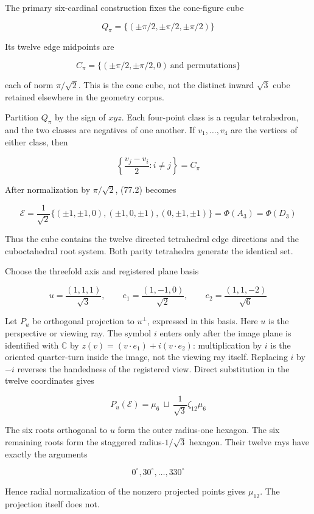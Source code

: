 \documentclass[
  11pt,
]{book}
\begin{document}
The primary six-cardinal construction fixes the cone-figure cube

\[
Q_\pi=\{(\pm\pi/2,\pm\pi/2,\pm\pi/2)\}
\tag{77.1}
\]

Its twelve edge midpoints are

\[
C_\pi=
\{(\pm\pi/2,\pm\pi/2,0)\ \text{and permutations}\}
\tag{77.2}
\]

each of norm \(\pi/\sqrt2\). This is the cone cube, not the distinct
inward \(\sqrt3\) cube retained elsewhere in the geometry corpus.

Partition \(Q_\pi\) by the sign of \(xyz\). Each four-point class is a
regular tetrahedron, and the two classes are negatives of one another.
If \(v_1,\ldots,v_4\) are the vertices of either class, then

\[
\left\{\frac{v_j-v_i}{2}:i\ne j\right\}=C_\pi
\tag{77.3}
\]

After normalization by \(\pi/\sqrt2\), (77.2) becomes

\[
\boxed{
\mathcal E=\frac1{\sqrt2}
\{(\pm1,\pm1,0),(\pm1,0,\pm1),(0,\pm1,\pm1)\}
=\Phi(A_3)=\Phi(D_3)}
\tag{77.4}
\]

Thus the cube contains the twelve directed tetrahedral edge directions
and the cuboctahedral root system. Both parity tetrahedra generate the
identical set.

Choose the threefold axis and registered plane basis

\[
u=\frac{(1,1,1)}{\sqrt3},\qquad
e_1=\frac{(1,-1,0)}{\sqrt2},\qquad
e_2=\frac{(1,1,-2)}{\sqrt6}
\tag{77.5}
\]

Let \(P_u\) be orthogonal projection to \(u^\perp\), expressed in this
basis. Here \(u\) is the perspective or viewing ray. The symbol \(i\)
enters only after the image plane is identified with \(\mathbb C\) by
\(z(v)=(v\cdot e_1)+i(v\cdot e_2)\): multiplication by \(i\) is the
oriented quarter-turn inside the image, not the viewing ray itself.
Replacing \(i\) by \(-i\) reverses the handedness of the registered
view. Direct substitution in the twelve coordinates gives

\[
\boxed{
P_u(\mathcal E)
=\mu_6\ \sqcup\
\frac1{\sqrt3}\zeta_{12}\mu_6}
\tag{77.6}
\]

The six roots orthogonal to \(u\) form the outer radius-one hexagon. The
six remaining roots form the staggered radius-\(1/\sqrt3\) hexagon.
Their twelve rays have exactly the arguments

\[
0^\circ,30^\circ,\ldots,330^\circ
\tag{77.7}
\]

Hence radial normalization of the nonzero projected points gives
\(\mu_{12}\). The projection itself does not.
\end{document}
